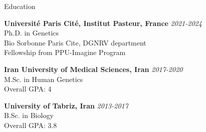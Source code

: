 \documentclass[
	11pt, %
]{resume} %
\begin{document}

\begin{rSection}{Education}
	
	\textbf{Université Paris Cité, Institut Pasteur, France} \hfill \textit{2021-2024} \\ 
	Ph.D. in Genetics \\
	Bio Sorbonne Paris Cite, DGNRV department \\
	Fellowship from PPU-Imagine Program 
	
	\textbf{Iran University of Medical Sciences, Iran} \hfill \textit{2017-2020} \\ 
	M.Sc. in Human Genetics  \\
	Overall GPA: 4
	
	\textbf{University of Tabriz, Iran} \hfill \textit{2013-2017} \\ 
	B.Sc. in Biology  \\
	Overall GPA: 3.8
	
\end{rSection}

\end{document}

